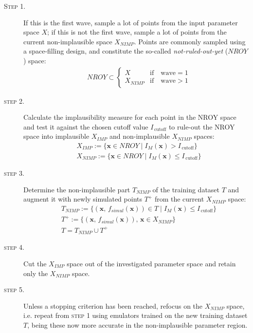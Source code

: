 \begin{description}
    \item[\textsc{Step 1.}] If this is the first wave, sample a lot of points from the input parameter space $X$; if this is not the first wave, sample a lot of points from the current non-implausible space $X_{NIMP}$. Points are commonly sampled using a space-filling design, and constitute the so-called \textit{not-ruled-out-yet} ($NROY$) space:
    \begin{align*}
        & NROY\subset\begin{cases}
        X &\text{if}\quad \text{wave}=1 \\
        X_{NIMP} &\text{if}\quad \text{wave}>1
        \end{cases}
    \end{align*} 
    \item[\textsc{step 2.}] Calculate the implausibility measure for each point in the NROY space and test it against the chosen cutoff value $I_{\,\text{cutoff}}$ to rule-out the NROY space into implausible $X_{IMP}$ and non-implausible $X_{NIMP}$ spaces:
    \begin{align*}
        & X_{IMP} := \{\mathbf{x}\in NROY\;\vert\;I_{M}(\mathbf{x}) > I_{\,\text{cutoff}}\} \\
        & X_{NIMP} := \{\mathbf{x}\in NROY\;\vert\;I_{M}(\mathbf{x}) \le I_{\,\text{cutoff}}\}
    \end{align*}
    \item[\textsc{step 3.}] Determine the non-implausible part $T_{NIMP}$ of the training dataset $T$ and augment it with newly simulated points $T^{+}$ from the current $X_{NIMP}$ space:
    \begin{align*}
        & T_{NIMP} := \{(\mathbf{x},\,f_{simul}(\mathbf{x}))\in T\;\vert\;I_{M}(\mathbf{x}) \le I_{\,\text{cutoff}}\} \\
        & T^{+} := \{(\mathbf{x},\,f_{simul}(\mathbf{x})),\,\mathbf{x}\in X_{NIMP}\} \\
        & T = T_{NIMP}\cup T^{+}
    \end{align*}
    \item[\textsc{step 4.}] Cut the $X_{IMP}$ space out of the investigated parameter space and retain only the $X_{NIMP}$ space.
    \item[\textsc{step 5.}] Unless a stopping criterion has been reached, refocus on the $X_{NIMP}$ space, i.e. repeat from \textsc{step 1} using emulators trained on the new training dataset $T$, being these now more accurate in the non-implausible parameter region.
\end{description}

